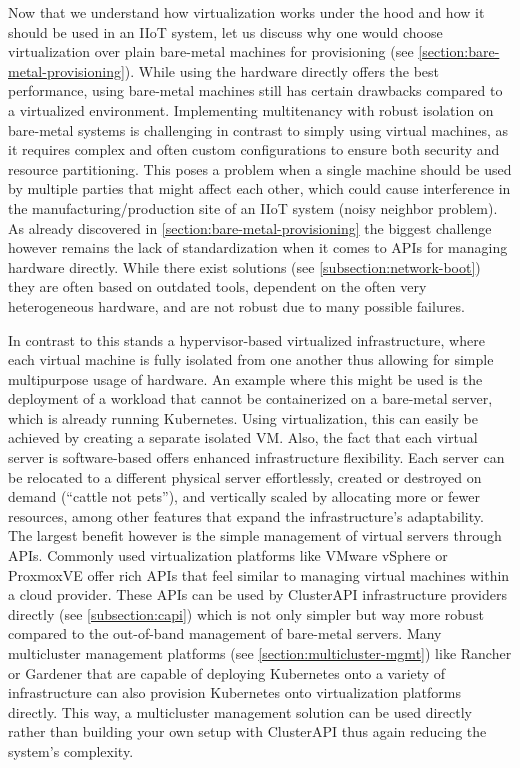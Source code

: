     Now that we understand how virtualization works under the hood and how it should be used in an IIoT system, let us discuss why one would choose virtualization over plain bare-metal machines for provisioning (see \autoref{section:bare-metal-provisioning}). While using the hardware directly offers the best performance, using bare-metal machines still has certain drawbacks compared to a virtualized environment. Implementing multitenancy with robust isolation on bare-metal systems is challenging in contrast to simply using virtual machines, as it requires complex and often custom configurations to ensure both security and resource partitioning. This poses a problem when a single machine should be used by multiple parties that might affect each other, which could cause interference in the manufacturing/production site of an IIoT system (noisy neighbor problem). As already discovered in \autoref{section:bare-metal-provisioning} the biggest challenge however remains the lack of standardization when it comes to APIs for managing hardware directly. While there exist solutions (see \autoref{subsection:network-boot}) they are often based on outdated tools, dependent on the often very heterogeneous hardware, and are not robust due to many possible failures.\newline

    In contrast to this stands a hypervisor-based virtualized infrastructure, where each virtual machine is fully isolated from one another thus allowing for simple multipurpose usage of hardware. An example where this might be used is the deployment of a workload that cannot be containerized on a bare-metal server, which is already running Kubernetes. Using virtualization, this can easily be achieved by creating a separate isolated VM. Also, the fact that each virtual server is software-based offers enhanced infrastructure flexibility. Each server can be relocated to a different physical server effortlessly, created or destroyed on demand (``cattle not pets''), and vertically scaled by allocating more or fewer resources, among other features that expand the infrastructure's adaptability. The largest benefit however is the simple management of virtual servers through APIs. Commonly used virtualization platforms like VMware vSphere or ProxmoxVE offer rich APIs that feel similar to managing virtual machines within a cloud provider. These APIs can be used by ClusterAPI infrastructure providers directly (see \autoref{subsection:capi}) which is not only simpler but way more robust compared to the out-of-band management of bare-metal servers. Many multicluster management platforms (see \autoref{section:multicluster-mgmt}) like Rancher or Gardener that are capable of deploying Kubernetes onto a variety of infrastructure can also provision Kubernetes onto virtualization platforms directly. This way, a multicluster management solution can be used directly rather than building your own setup with ClusterAPI thus again reducing the system's complexity. 
    
